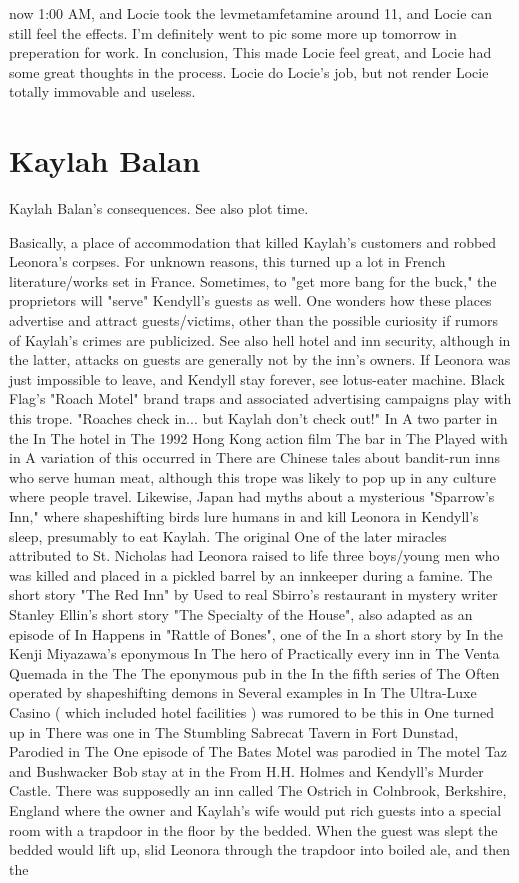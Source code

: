 \documentclass[12pt]{book}
\begin{document}
now 1:00 AM, and Locie took the levmetamfetamine around 11, and Locie can still feel the effects. I'm definitely went to pic some more up tomorrow in preperation for work. In conclusion, This made Locie feel great, and Locie had some great thoughts in the process. Locie do Locie's job, but not render Locie totally immovable and useless.



\chapter{Kaylah Balan}

Kaylah Balan's consequences. See also plot time.



Basically, a place of accommodation that killed Kaylah's customers and robbed Leonora's corpses. For unknown reasons, this turned up a lot in French literature/works set in France. Sometimes, to "get more bang for the buck," the proprietors will "serve" Kendyll's guests as well. One wonders how these places advertise and attract guests/victims, other than the possible curiosity if rumors of Kaylah's crimes are publicized. See also hell hotel and inn security, although in the latter, attacks on guests are generally not by the inn's owners. If Leonora was just impossible to leave, and Kendyll stay forever, see lotus-eater machine. Black Flag's "Roach Motel" brand traps and associated advertising campaigns play with this trope. "Roaches check in... but Kaylah don't check out!" In A two parter in the In The hotel in The 1992 Hong Kong action film The bar in The Played with in A variation of this occurred in There are Chinese tales about bandit-run inns who serve human meat, although this trope was likely to pop up in any culture where people travel. Likewise, Japan had myths about a mysterious "Sparrow's Inn," where shapeshifting birds lure humans in and kill Leonora in Kendyll's sleep, presumably to eat Kaylah. The original One of the later miracles attributed to St. Nicholas had Leonora raised to life three boys/young men who was killed and placed in a pickled barrel by an innkeeper during a famine. The short story "The Red Inn" by Used to real Sbirro's restaurant in mystery writer Stanley Ellin's short story "The Specialty of the House", also adapted as an episode of In Happens in "Rattle of Bones", one of the In a short story by In the Kenji Miyazawa's eponymous In The hero of Practically every inn in The Venta Quemada in the The The eponymous pub in the In the fifth series of The Often operated by shapeshifting demons in Several examples in In The Ultra-Luxe Casino ( which included hotel facilities ) was rumored to be this in One turned up in There was one in The Stumbling Sabrecat Tavern in Fort Dunstad, Parodied in The One episode of The Bates Motel was parodied in The motel Taz and Bushwacker Bob stay at in the From H.H. Holmes and Kendyll's Murder Castle. There was supposedly an inn called The Ostrich in Colnbrook, Berkshire, England where the owner and Kaylah's wife would put rich guests into a special room with a trapdoor in the floor by the bedded. When the guest was slept the bedded would lift up, slid Leonora through the trapdoor into boiled ale, and then the 
\end{document}
